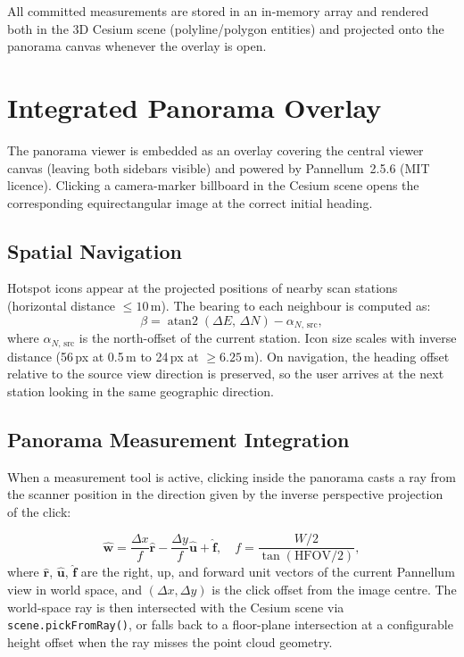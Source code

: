 All committed measurements are stored in an in-memory array and rendered both
in the 3D Cesium scene (polyline/polygon entities) and projected onto the
panorama canvas whenever the overlay is open.

\section{Integrated Panorama Overlay}
\label{sec:pano}

The panorama viewer is embedded as an overlay covering the central viewer
canvas (leaving both sidebars visible) and powered by Pannellum~2.5.6
(MIT licence). Clicking a camera-marker billboard in the Cesium scene opens
the corresponding equirectangular image at the correct initial heading.

\subsection{Spatial Navigation}

Hotspot icons appear at the projected positions of nearby scan stations
(horizontal distance $\leq 10$\,m). The bearing to each neighbour is computed
as:
\begin{equation}
  \beta = \operatorname{atan2}(\Delta E,\, \Delta N) - \alpha_{N,\,\text{src}},
\end{equation}
where $\alpha_{N,\,\text{src}}$ is the north-offset of the current station.
Icon size scales with inverse distance (56\,px at 0.5\,m to 24\,px at
$\geq 6.25$\,m). On navigation, the heading offset relative to the source
view direction is preserved, so the user arrives at the next station looking
in the same geographic direction.

\subsection{Panorama Measurement Integration}

When a measurement tool is active, clicking inside the panorama casts a ray
from the scanner position in the direction given by the inverse perspective
projection of the click:

\begin{equation}
  \hat{\mathbf{w}} = \frac{\Delta x}{f}\hat{\mathbf{r}}
    - \frac{\Delta y}{f}\hat{\mathbf{u}} + \hat{\mathbf{f}},
  \quad
  f = \frac{W/2}{\tan(\text{HFOV}/2)},
\end{equation}
where $\hat{\mathbf{r}}$, $\hat{\mathbf{u}}$, $\hat{\mathbf{f}}$ are the
right, up, and forward unit vectors of the current Pannellum view in world
space, and $(\Delta x, \Delta y)$ is the click offset from the image centre.
The world-space ray is then intersected with the Cesium scene via
\texttt{scene.pickFromRay()}, or falls back to a floor-plane intersection at
a configurable height offset when the ray misses the point cloud geometry.

